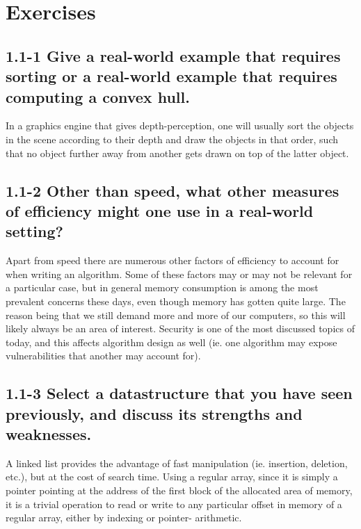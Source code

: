\documentclass[11pt,english]{article}
\begin{document}

\newpage
\pagestyle{fancy}

\section*{Exercises}

\subsection*{1.1-1 \mdseries Give a real-world example that requires sorting
or a real-world example that requires computing a convex hull.}
In a graphics engine that gives depth-perception, one will usually sort the
objects in the scene according to their depth and draw the objects in that
order, such that no object further away from another gets drawn on top of the
latter object.


\subsection*{1.1-2 \mdseries Other than speed, what other measures of
efficiency might one use in a real-world setting?}
Apart from speed there are numerous other factors of efficiency to account for
when writing an algorithm. Some of these factors may or may not be relevant for
a particular case, but in general memory consumption is among the most
prevalent concerns these days, even though memory has gotten quite large. The
reason being that we still demand more and more of our computers, so this will
likely always be an area of interest. Security is one of the most discussed
topics of today, and this affects algorithm design as well (ie. one algorithm
may expose vulnerabilities that another may account for).

\subsection*{1.1-3 \mdseries Select a datastructure that you have seen
previously, and discuss its strengths and weaknesses.}
A linked list provides the advantage of fast manipulation (ie. insertion,
deletion, etc.), but at the cost of search time. Using a regular array, since
it is simply a pointer pointing at the address of the first block of the
allocated area of memory, it is a trivial operation to read or write to any
particular offset in memory of a regular array, either by indexing or pointer-
arithmetic.
\end{document}
